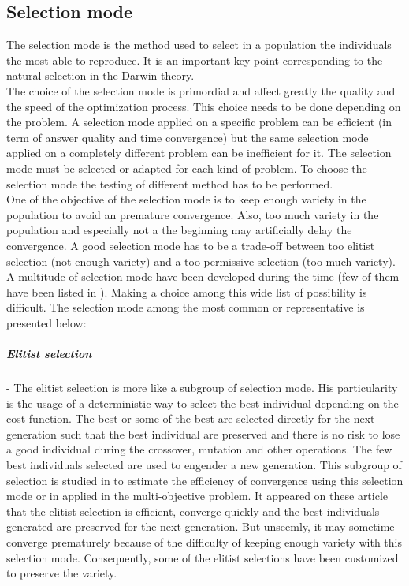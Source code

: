 \subsection{Selection mode }

 The selection mode is  the method  used to select in a population the individuals the most able to reproduce. It is an important key point corresponding to the natural selection in the Darwin theory. \\
The choice of the selection mode is primordial and affect greatly the quality and the speed of the optimization process. This choice needs to be done depending on the problem. A selection mode applied on a specific problem  can be efficient (in term of answer quality and time convergence)  but  the same  selection mode applied on  a completely different problem can be inefficient for it.  The selection mode must be selected or adapted for each kind of problem. To choose the selection mode  the testing of different method has to be performed.\\
One of the objective of the selection mode is to keep enough variety in the population to avoid an premature  convergence. Also, too much variety in the population and especially not a the beginning may artificially delay the convergence. A good selection mode has to be a trade-off between too elitist selection (not enough variety) and a too permissive selection (too much variety). \\
A multitude of selection mode have been developed during the time (few of them have been listed in \cite{123*owais2008}). Making a choice among this wide list of possibility is difficult. The selection mode among the most common  or representative is  presented below:    \\

\subparagraph{Elitist selection}
-	The elitist selection is more like a subgroup of selection mode. His particularity is the usage of a deterministic way to select the best individual depending on the cost function. The best or some of the best are selected directly for the next generation such that the best individual are preserved and there is no risk  to lose a good individual during the crossover, mutation and other operations. The few best individuals selected are used to engender a new generation.
  This subgroup of selection is studied in \cite{69*deb2000,64*matsui1999}  to estimate the efficiency of convergence using this selection mode or in \cite{140*soremekun2001} applied in the multi-objective problem. It appeared on these article that the elitist selection is efficient, converge quickly and the best individuals generated are preserved  for the next generation. But unseemly, it may sometime converge prematurely  because of the difficulty of keeping enough variety with this selection mode. Consequently, some of the elitist selections have been customized to preserve the variety. \\
	
